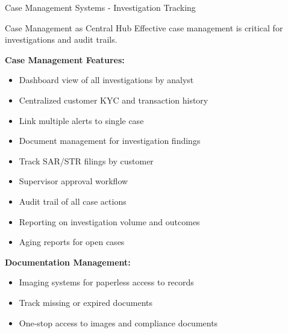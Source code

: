\documentclass[11pt,a4paper]{beamer}
\begin{document}
	\begin{frame}{Case Management Systems - Investigation Tracking}
		\begin{block}{Case Management as Central Hub}
			Effective case management is critical for investigations and audit trails.
		\end{block}
		\textbf{Case Management Features:}
		\begin{itemize}
			\item Dashboard view of all investigations by analyst
			\item Centralized customer KYC and transaction history
			\item Link multiple alerts to single case
			\item Document management for investigation findings
			\item Track SAR/STR filings by customer
			\item Supervisor approval workflow
			\item Audit trail of all case actions
			\item Reporting on investigation volume and outcomes
			\item Aging reports for open cases
		\end{itemize}
		\textbf{Documentation Management:}
		\begin{itemize}
			\item Imaging systems for paperless access to records
			\item Track missing or expired documents
			\item One-stop access to images and compliance documents
		\end{itemize}
	\end{frame}
	
	
\end{document}
